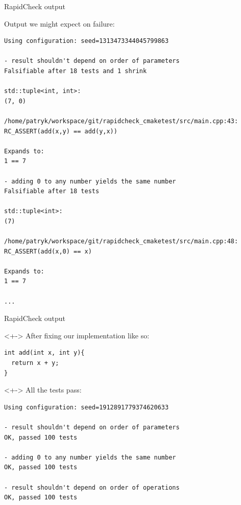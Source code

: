 \documentclass{beamer}
\begin{document}

\begin{frame}[fragile]{RapidCheck output}

Output we might expect on failure:

\begin{lstlisting}[style=shell]
Using configuration: seed=1313473344045799863

- result shouldn't depend on order of parameters
Falsifiable after 18 tests and 1 shrink

std::tuple<int, int>:
(7, 0)

/home/patryk/workspace/git/rapidcheck_cmaketest/src/main.cpp:43:
RC_ASSERT(add(x,y) == add(y,x))

Expands to:
1 == 7

- adding 0 to any number yields the same number
Falsifiable after 18 tests

std::tuple<int>:
(7)

/home/patryk/workspace/git/rapidcheck_cmaketest/src/main.cpp:48:
RC_ASSERT(add(x,0) == x)

Expands to:
1 == 7

...
\end{lstlisting}

\end{frame}


\begin{frame}[fragile]{RapidCheck output}

\begin{uncoverenv}<+->
After fixing our implementation like so:
\begin{lstlisting}[style=cpp]
int add(int x, int y){
  return x + y;
}
\end{lstlisting}
\end{uncoverenv}

\begin{uncoverenv}<+->
All the tests pass:
\begin{lstlisting}[style=shell]
Using configuration: seed=1912891779374620633

- result shouldn't depend on order of parameters
OK, passed 100 tests

- adding 0 to any number yields the same number
OK, passed 100 tests

- result shouldn't depend on order of operations
OK, passed 100 tests
\end{lstlisting}
\end{uncoverenv}

\end{frame}
\end{document}
